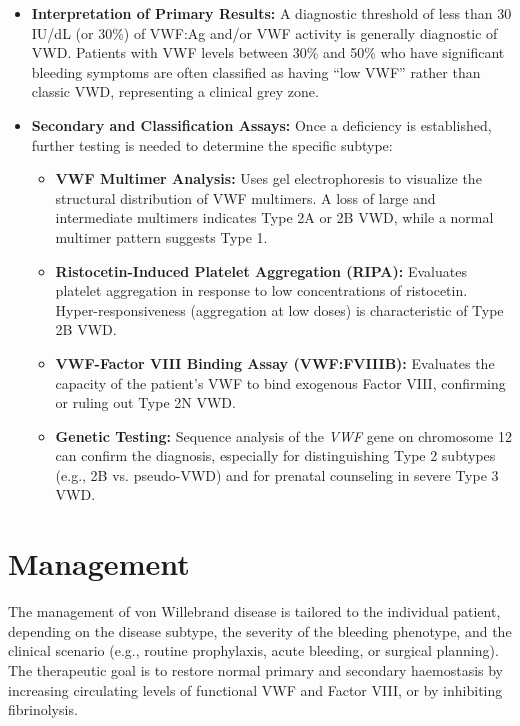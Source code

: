 \begin{itemize}
\begin{itemize}
    \end{itemize}
    \item \textbf{Interpretation of Primary Results:} A diagnostic threshold of less than 30 IU/dL (or 30\%) of VWF:Ag and/or VWF activity is generally diagnostic of VWD. Patients with VWF levels between 30\% and 50\% who have significant bleeding symptoms are often classified as having ``low VWF'' rather than classic VWD, representing a clinical grey zone.
    \item \textbf{Secondary and Classification Assays:} Once a deficiency is established, further testing is needed to determine the specific subtype:
    \begin{itemize}
        \item \textbf{VWF Multimer Analysis:} Uses gel electrophoresis to visualize the structural distribution of VWF multimers. A loss of large and intermediate multimers indicates Type 2A or 2B VWD, while a normal multimer pattern suggests Type 1.
        \item \textbf{Ristocetin-Induced Platelet Aggregation (RIPA):} Evaluates platelet aggregation in response to low concentrations of ristocetin. Hyper-responsiveness (aggregation at low doses) is characteristic of Type 2B VWD.
        \item \textbf{VWF-Factor VIII Binding Assay (VWF:FVIIIB):} Evaluates the capacity of the patient's VWF to bind exogenous Factor VIII, confirming or ruling out Type 2N VWD.
        \item \textbf{Genetic Testing:} Sequence analysis of the \textit{VWF} gene on chromosome 12 can confirm the diagnosis, especially for distinguishing Type 2 subtypes (e.g., 2B vs. pseudo-VWD) and for prenatal counseling in severe Type 3 VWD.
    \end{itemize}
\end{itemize}

\section*{Management}
The management of von Willebrand disease is tailored to the individual patient, depending on the disease subtype, the severity of the bleeding phenotype, and the clinical scenario (e.g., routine prophylaxis, acute bleeding, or surgical planning). The therapeutic goal is to restore normal primary and secondary haemostasis by increasing circulating levels of functional VWF and Factor VIII, or by inhibiting fibrinolysis.


